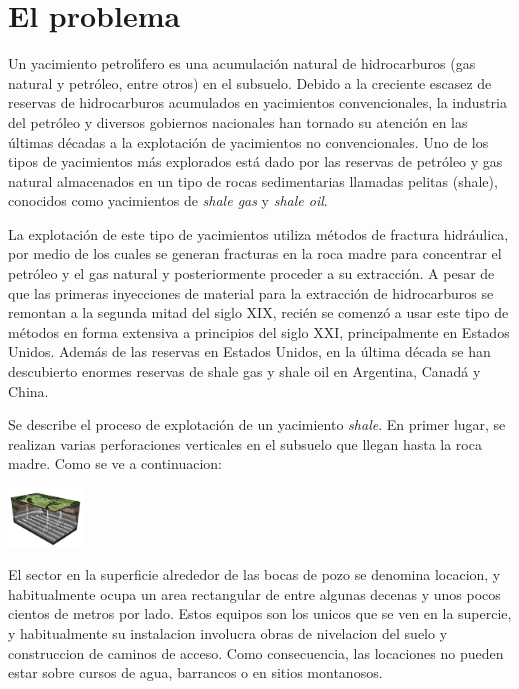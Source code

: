 \newpage
\section{El problema}\label{sec:problema}

Un yacimiento petrol\'\i fero es una acumulaci\'on natural de hidrocarburos (gas natural y petr\'oleo, entre otros) en el subsuelo. Debido a la creciente escasez de reservas de hidrocarburos acumulados en yacimientos convencionales, la industria del petr\'oleo y diversos gobiernos nacionales han tornado su atenci\'on en las \'ultimas d\'ecadas a la explotaci\'on de yacimientos no convencionales. Uno de los tipos de yacimientos m\'as explorados est\'a dado por las reservas de petr\'oleo y gas natural almacenados en un tipo de rocas sedimentarias llamadas pelitas (shale), conocidos como yacimientos de \emph{shale gas} y \emph{shale oil}.
 
La explotaci\'on de este tipo de yacimientos utiliza m\'etodos de fractura hidr\'aulica, por medio de los cuales se generan fracturas en la roca madre para concentrar el petr\'oleo y el gas natural y posteriormente proceder a su extracci\'on. A pesar de que las primeras inyecciones de material para la extracci\'on de hidrocarburos se remontan a la segunda mitad del siglo XIX, reci\'en se comenz\'o a usar este tipo de m\'etodos en forma extensiva a prin\-ci\-pios del siglo XXI, principalmente en Estados Unidos. Adem\'as de las reservas en Estados Unidos, en la \'ultima d\'ecada se han descubierto enormes reservas de shale gas y shale oil en Argentina, Canad\'a y China.

Se describe el proceso de explotaci\'on de un yacimiento \emph{shale}. En primer lugar, se realizan varias perforaciones verticales en el subsuelo que llegan hasta la roca madre. Como se ve a continuacion:

\begin{center}
\includegraphics[width=0.15\textwidth]{imagenes/figura1}
\end{center}


El sector en la superficie alrededor de las bocas de pozo se denomina locacion, y habitualmente ocupa un area rectangular de entre algunas decenas y unos pocos cientos de metros por lado. Estos equipos son los unicos que se ven en la supercie, y habitualmente su instalacion involucra obras de nivelacion del suelo y construccion de caminos de acceso. Como consecuencia, las locaciones no pueden estar sobre cursos de agua, barrancos o en sitios montanosos.

